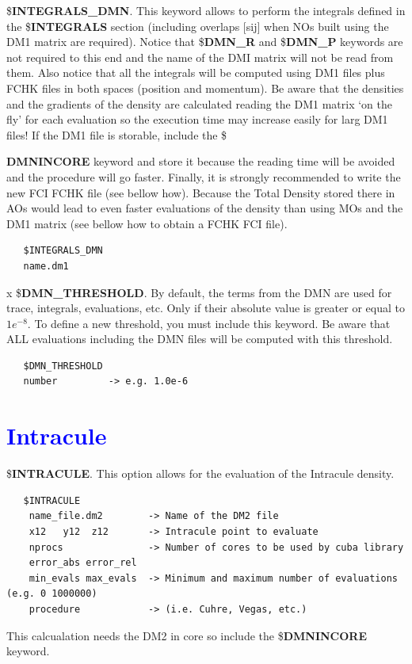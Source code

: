 \documentclass[10pt,a4paper]{article}
\newcommand{\tbl}[1]{{\textcolor{blue}{#1}}}
\begin{document}
\noindent \$\textbf{INTEGRALS\_DMN}. This keyword allows to perform the integrals defined in the \$\textbf{INTEGRALS} section (including overlaps $[$sij$]$ when NOs built using the DM1 matrix are required). Notice that \$\textbf{DMN\_R} and \$\textbf{DMN\_P} keywords are not required to this end and the name of the DMI matrix will not be read from them. Also notice that all the integrals will be computed using DM1 files plus FCHK files in both spaces (position and momentum). Be aware that the densities and the gradients of the density are calculated reading the DM1 matrix `on the fly' for each evaluation so the execution time may increase easily for larg DM1 files! If the DM1 file is storable, include the \${\textbf{DMNINCORE} keyword and store it because the reading time will be avoided and the procedure will go faster. Finally, it is strongly recommended to write the new FCI FCHK file (see bellow how). Because the Total Density stored there in AOs would lead to even faster evaluations of the density than using MOs and the DM1 matrix (see bellow how to obtain a FCHK FCI file). 
\begin{verbatim}
   $INTEGRALS_DMN
   name.dm1
\end{verbatim}
{\color{white} x}
\newline
\newline 
\noindent \$\textbf{DMN\_THRESHOLD}. By default, the terms from the DMN are used for trace, integrals, evaluations, etc. Only if their absolute value is greater or equal to $1e^{-8}$. To define a new threshold, you must include this keyword. Be aware that ALL evaluations including the DMN files will be computed with this threshold.
\begin{verbatim}
   $DMN_THRESHOLD
   number         -> e.g. 1.0e-6
\end{verbatim} 
\section{\tbl{\textbf{Intracule}}}
\noindent \$\textbf{INTRACULE}. This option allows for the evaluation of the Intracule density.\newline
\begin{verbatim}
   $INTRACULE
    name_file.dm2        -> Name of the DM2 file
    x12   y12  z12       -> Intracule point to evaluate 
    nprocs               -> Number of cores to be used by cuba library
    error_abs error_rel    
    min_evals max_evals  -> Minimum and maximum number of evaluations (e.g. 0 1000000)
    procedure            -> (i.e. Cuhre, Vegas, etc.)
\end{verbatim}
This calcualation needs the DM2 in core so include the \$\textbf{DMNINCORE} keyword.
}
\end{document}
